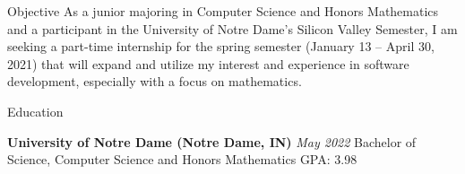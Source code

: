 \documentclass[10pt]{resume} %
\begin{document}
\begin{rSection}{Objective}{}{}{}
 As a junior majoring in Computer Science and Honors Mathematics and a participant in the University of Notre Dame’s Silicon Valley Semester, I am seeking a part-time internship for the spring semester (January 13 – April 30, 2021) that will expand and utilize my interest and experience in software development, especially with a focus on mathematics.
\end{rSection}




\begin{rSection}{Education}





{\bf University of Notre Dame (Notre Dame, IN) } \hfill { \em May 2022 } 
 Bachelor of Science, Computer Science and Honors Mathematics\hfill { GPA: 3.98 }

\end{rSection}


\end{document}
